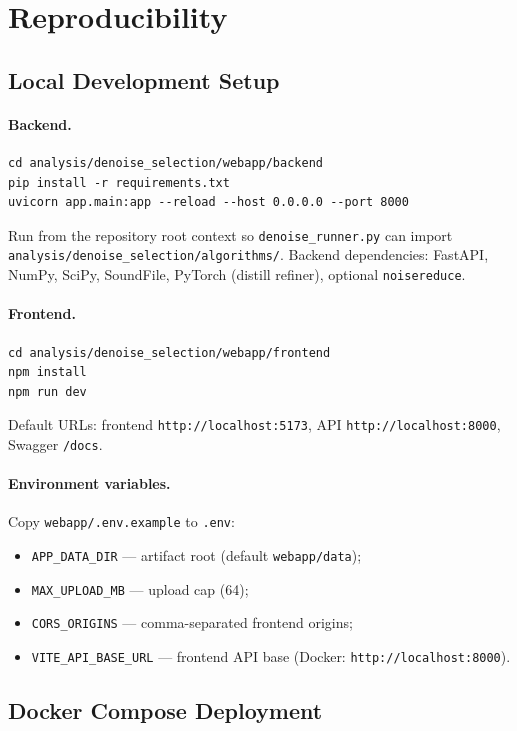 \section{Reproducibility}
\label{sec:reproducibility}

\subsection{Local Development Setup}

\paragraph{Backend.}
\begin{verbatim}
cd analysis/denoise_selection/webapp/backend
pip install -r requirements.txt
uvicorn app.main:app --reload --host 0.0.0.0 --port 8000
\end{verbatim}
Run from the repository root context so \texttt{denoise\_runner.py} can import \texttt{analysis/denoise\_selection/algorithms/}. Backend dependencies: FastAPI, NumPy, SciPy, SoundFile, PyTorch (distill refiner), optional \texttt{noisereduce}.

\paragraph{Frontend.}
\begin{verbatim}
cd analysis/denoise_selection/webapp/frontend
npm install
npm run dev
\end{verbatim}
Default URLs: frontend \texttt{http://localhost:5173}, API \texttt{http://localhost:8000}, Swagger \texttt{/docs}.

\paragraph{Environment variables.}
Copy \texttt{webapp/.env.example} to \texttt{.env}:
\begin{itemize}
  \item \texttt{APP\_DATA\_DIR} --- artifact root (default \texttt{webapp/data});
  \item \texttt{MAX\_UPLOAD\_MB} --- upload cap (64);
  \item \texttt{CORS\_ORIGINS} --- comma-separated frontend origins;
  \item \texttt{VITE\_API\_BASE\_URL} --- frontend API base (Docker: \texttt{http://localhost:8000}).
\end{itemize}

\subsection{Docker Compose Deployment}

